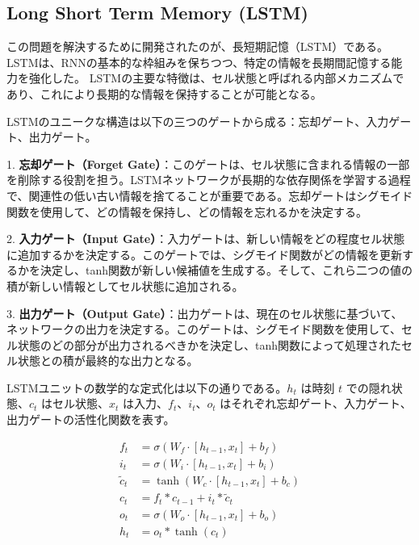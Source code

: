     \subsection{Long Short Term Memory (LSTM)}
    この問題を解決するために開発されたのが、長短期記憶（LSTM）である。
    LSTMは、RNNの基本的な枠組みを保ちつつ、特定の情報を長期間記憶する能力を強化した。
    LSTMの主要な特徴は、セル状態と呼ばれる内部メカニズムであり、これにより長期的な情報を保持することが可能となる。
    
    LSTMのユニークな構造は以下の三つのゲートから成る：忘却ゲート、入力ゲート、出力ゲート。
    
    1. \textbf{忘却ゲート（Forget Gate）}：このゲートは、セル状態に含まれる情報の一部を削除する役割を担う。LSTMネットワークが長期的な依存関係を学習する過程で、関連性の低い古い情報を捨てることが重要である。忘却ゲートはシグモイド関数を使用して、どの情報を保持し、どの情報を忘れるかを決定する。
   
    2. \textbf{入力ゲート（Input Gate）}：入力ゲートは、新しい情報をどの程度セル状態に追加するかを決定する。このゲートでは、シグモイド関数がどの情報を更新するかを決定し、tanh関数が新しい候補値を生成する。そして、これら二つの値の積が新しい情報としてセル状態に追加される。
    
    3. \textbf{出力ゲート（Output Gate）}：出力ゲートは、現在のセル状態に基づいて、ネットワークの出力を決定する。このゲートは、シグモイド関数を使用して、セル状態のどの部分が出力されるべきかを決定し、tanh関数によって処理されたセル状態との積が最終的な出力となる。
    
    LSTMユニットの数学的な定式化は以下の通りである。\( h_t \) は時刻 \( t \) での隠れ状態、\( c_t \) はセル状態、\( x_t \) は入力、\( f_t \)、\( i_t \)、\( o_t \) はそれぞれ忘却ゲート、入力ゲート、出力ゲートの活性化関数を表す。
    
    \begin{align}
      f_t &= \sigma(W_f \cdot [h_{t-1}, x_t] + b_f) \\
      i_t &= \sigma(W_i \cdot [h_{t-1}, x_t] + b_i) \\
      \tilde{c}_t &= \tanh(W_c \cdot [h_{t-1}, x_t] + b_c) \\
      c_t &= f_t * c_{t-1} + i_t * \tilde{c}_t \\
      o_t &= \sigma(W_o \cdot [h_{t-1}, x_t] + b_o) \\
      h_t &= o_t * \tanh(c_t)
    \end{align}
    
